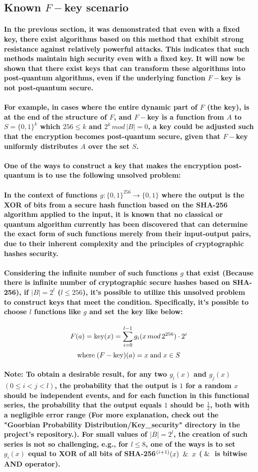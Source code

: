 \documentclass[oneside]{book}
\newcommand{\myparagraph}[1]{\paragraph{\textnormal{#1}}}
\begin{document}
\newpage

\subsection{Known $F-$key scenario}

\myparagraph{
In the previous section, it was demonstrated that even with a fixed key, there exist algorithms based on this method that exhibit strong resistance against relatively powerful attacks. This indicates that such methods maintain high security even with a fixed key. It will now be shown that there exist keys that can transform these algorithms into post-quantum algorithms, even if the underlying function $F-$key is not post-quantum secure.
}

\myparagraph{
For example, in cases where the entire dynamic part of $F$ (the key), is at the end of the structure of $F$, and $F-$key is a function from $A$ to $S = \{0, 1\}^k$ which $256 \le k$ and $2^k \, mod \, |B| = 0$, a key could be adjusted such that the encryption becomes post-quantum secure, given that $F-$key uniformly distributes $A$ over the set $S$.
}

\myparagraph{
\textbf{One of the ways to construct a key that makes the encryption post-quantum is to use the following unsolved problem:}
}

\myparagraph{
In the context of functions $g: \{0, 1\}^{256} \rightarrow \{0, 1\}$ where the output is the XOR of bits from a secure hash function based on the SHA-256 algorithm applied to the input, it is known that no classical or quantum algorithm currently has been discovered that can determine the exact form of such functions merely from their input-output pairs, due to their inherent complexity and the principles of cryptographic hashes security.
}

\myparagraph{
Considering the infinite number of such functions $g$ that exist (Because there is infinite number of cryptographic secure hashes based on SHA-256), if $|B| = 2 ^ l$ ($l \le 256$), it's possible to utilize this unsolved problem to construct keys that meet the condition. Specifically, it's possible to choose $l$ functions like $g$ and set the key like below:
}

$$F(a) = \textnormal{key}(x) = \sum_{i=0}^{l-1} g_i(x\, mod \, 2^{256}) \cdot 2 ^ i $$
$$ \text{where} \; (F - \text{key})(a) = x \; \textnormal{and} \; x \in S$$

\myparagraph{
\textbf{Note:} To obtain a desirable result, for any two $g_i(x)$ and $g_j(x)$ $(0 \le i  < j < l)$, the probability that the output is $1$ for a random $x$ should be independent events, and for each function in this functional series, the probability that the output equals $1$ should be $\frac{1}{2}$, both with a negligible error range (For more explanation, check out the \textbf{"Goorbian Probability Distribution/Key\_security"} directory in the project's repository.). For small values of $|B| = 2^l$, the creation of such series is not so challenging, e.g., for $l \le 8$, one of the ways is to set $g_i(x)$ equal to XOR of all bits of SHA-256$^{(i+1)}(x) \And x$ ($\And$ is bitwise AND operator).
}
\end{document}
